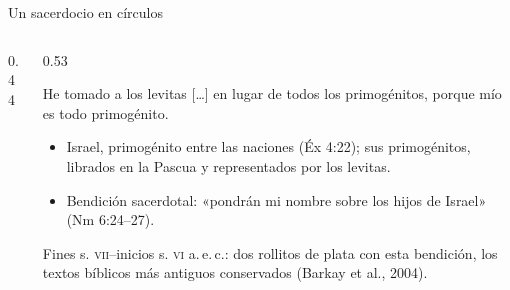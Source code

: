 \begin{frame}{Un sacerdocio en círculos}
\begin{columns}[c,onlytextwidth]
\begin{column}{0.44\textwidth}
\centering
{}
\elabpropia
\end{column}
\begin{column}{0.53\textwidth}
\begin{cita}He tomado a los levitas [\ldots] en lugar de todos los primogénitos, porque mío es todo primogénito.\end{cita}
\scriptsize
\begin{itemize}
\item Israel, primogénito entre las naciones (Éx 4:22); sus primogénitos, librados en la Pascua y representados por los levitas.
\item Bendición sacerdotal: «pondrán mi nombre sobre los hijos de Israel» (Nm 6:24--27).
\end{itemize}
\begin{notalam}
Fines s. \textsc{vii}--inicios s. \textsc{vi} a.\,e.\,c.: dos rollitos de plata con esta bendición, los textos bíblicos más antiguos conservados (Barkay et al., 2004).
\end{notalam}
\end{column}
\end{columns}
\end{frame}

